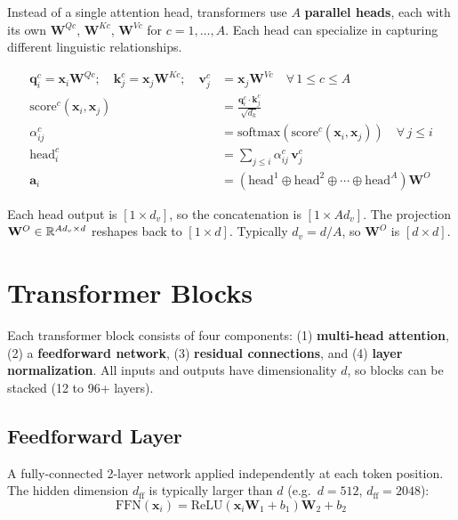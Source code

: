 \documentclass[main.tex]{subfiles}
\begin{document}
Instead of a single attention head, transformers use $A$ \textbf{parallel heads}, each with its own $\mathbf{W}^{Qc}$, $\mathbf{W}^{Kc}$, $\mathbf{W}^{Vc}$ for $c = 1, \ldots, A$. Each head can specialize in capturing different linguistic relationships.

\begin{align}
\mathbf{q}_i^c = \mathbf{x}_i \mathbf{W}^{Qc}; \quad \mathbf{k}_j^c = \mathbf{x}_j \mathbf{W}^{Kc}; \quad \mathbf{v}_j^c &= \mathbf{x}_j \mathbf{W}^{Vc} \quad \forall\, 1 \leq c \leq A \tag{8.15} \\[6pt]
\text{score}^c(\mathbf{x}_i, \mathbf{x}_j) &= \frac{\mathbf{q}_i^c \cdot \mathbf{k}_j^c}{\sqrt{d_k}} \tag{8.16} \\[6pt]
\alpha_{ij}^c &= \text{softmax}\left(\text{score}^c(\mathbf{x}_i, \mathbf{x}_j)\right) \quad \forall\, j \leq i \tag{8.17} \\[6pt]
\text{head}_i^c &= \sum_{j \leq i} \alpha_{ij}^c \, \mathbf{v}_j^c \tag{8.18} \\[6pt]
\mathbf{a}_i &= \left(\text{head}^1 \oplus \text{head}^2 \oplus \cdots \oplus \text{head}^A\right) \mathbf{W}^O \tag{8.19}
\end{align}

Each head output is $[1 \times d_v]$, so the concatenation is $[1 \times A d_v]$. The projection $\mathbf{W}^O \in \mathbb{R}^{A d_v \times d}$ reshapes back to $[1 \times d]$. Typically $d_v = d / A$, so $\mathbf{W}^O$ is $[d \times d]$.

\section{Transformer Blocks}

Each transformer block consists of four components: (1) \textbf{multi-head attention}, (2) a \textbf{feedforward network}, (3) \textbf{residual connections}, and (4) \textbf{layer normalization}. All inputs and outputs have dimensionality $d$, so blocks can be stacked (12 to 96+ layers).

\subsection{Feedforward Layer}

A fully-connected 2-layer network applied independently at each token position. The hidden dimension $d_{\text{ff}}$ is typically larger than $d$ (e.g.\ $d = 512$, $d_{\text{ff}} = 2048$):
$$\text{FFN}(\mathbf{x}_i) = \text{ReLU}(\mathbf{x}_i \mathbf{W}_1 + b_1) \mathbf{W}_2 + b_2 \tag{8.21}$$
\end{document}
